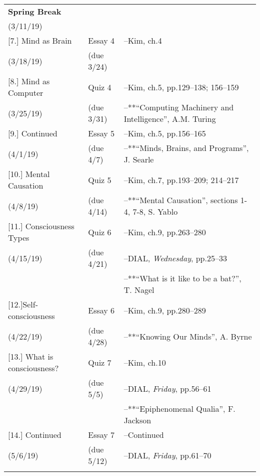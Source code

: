 \documentclass[article,oneside]{memoir}
\begin{document}
\begin{center}
\begin{longtable}{p{4.5cm}p{2cm}p{6cm}}
\textbf{Spring Break} 		 & 		  		&  \\
(3/11/19)			        		&		    	  	&  \\ [1.8\baselineskip]





  
[7.] Mind as Brain 		   	& Essay 4	   		& --Kim, ch.4\\
(3/18/19)				         & (due 3/24)			 & \\  [1.8\baselineskip]	


[8.] Mind as Computer		& Quiz 4			& --Kim, ch.5, pp.129--138; 156--159\\
(3/25/19)		            		& (due 3/31)		& --**``Computing Machinery and Intelligence'', A.M. Turing  \\  [1.8\baselineskip]

[9.] Continued			    	& Essay 5			& --Kim, ch.5, pp.156--165 \\
(4/1/19)					& (due 4/7)		& --**``Minds, Brains, and Programs'', J.  Searle \\ [1.8\baselineskip]

[10.] Mental Causation 		& Quiz 5			& --Kim, ch.7, pp.193--209; 214--217 \\
(4/8/19)				      	& (due 4/14)	      	& --**``Mental Causation'', sections 1-4, 7-8, S. Yablo  \\  [1.8\baselineskip]
				
[11.] Consciousness Types		 & Quiz 6			& --Kim, ch.9, pp.263--280 \\
(4/15/19)				      	& (due 4/21)		& --DIAL, \emph{Wednesday}, pp.25--33 \\
						& 				& --**``What is it like to be a bat?'', T. Nagel \\ [1.8\baselineskip]
 
[12.]Self-consciousness  	    	& Essay 6			& --Kim, ch.9, pp.280--289\\
(4/22/19)			      		& (due 4/28)		& --**``Knowing Our Minds'', A. Byrne  \\ [1.8\baselineskip]


[13.] What is consciousness? 	& Quiz 7			& --Kim, ch.10 \\ 
(4/29/19)				      	& (due 5/5)		& --DIAL, \emph{Friday}, pp.56--61 \\ 
					      	&			      	& --**``Epiphenomenal Qualia'', F. Jackson \\ [1.8\baselineskip]

						
[14.] Continued 	      		& Essay 7			&  --Continued \\
(5/6/19)				      	& (due 5/12)		&  --DIAL, \emph{Friday}, pp.61--70 \\ \\  [1.8\baselineskip]





\end{longtable}
\end{center}






\end{document}
